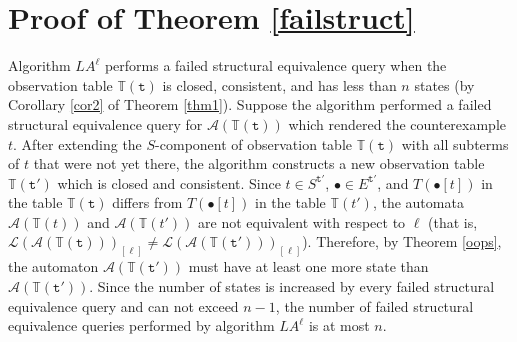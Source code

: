 \documentclass[preprint,12pt,english]{article}
\def\hole{\bullet}
\def\cA{\mathcal{A}}
\def\cL{\mathcal{L}}
\def\ty{\mathtt{t}}
\begin{document}
\section{Proof of Theorem \ref{failstruct}}
Algorithm $LA^\ell$ performs a failed structural equivalence query when the observation table $\mathbb{T}(\ty)$ is closed, consistent, and has less than $n$ states (by Corollary \ref{cor2} of Theorem \ref{thm1}). Suppose the algorithm performed a 
 failed structural equivalence query for $\cA(\mathbb{T}(\ty))$ which rendered the counterexample $t$. After extending the $S$-component of observation table $\mathbb{T}(\ty)$ with all subterms of $t$ that were not yet there, the algorithm constructs a new observation table $\mathbb{T}(\ty')$ which is closed and consistent. Since $t\in S^{\ty'}$, $\hole\in E^{\ty'}$, and $T(\hole[t])$ in the table $\mathbb{T}(\ty)$ differs from $T(\hole[t])$ in the table $\mathbb{T}(t')$, the automata $\cA(\mathbb{T}(t))$ and $\cA(\mathbb{T}(t'))$ are not equivalent with respect to $\ell$ (that is, $\cL(\cA(\mathbb{T}(\ty)))_{[\ell]}\neq\cL(\cA(\mathbb{T}(\ty')))_{[\ell]}$). Therefore, by Theorem \ref{oops}, the automaton $\cA(\mathbb{T}(\ty'))$ must have at least one more state than 
$\cA(\mathbb{T}(\ty'))$. Since the number of states is increased by every failed structural equivalence query and can not exceed $n-1$, the number of failed structural equivalence queries performed by algorithm $LA^\ell$ is at most $n$. 
\end{document}
